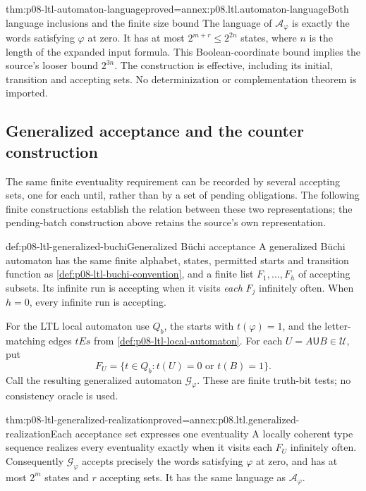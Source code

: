 \begin{hbtheorem}{thm:p08-ltl-automaton-language}{proved=annex:p08.ltl.automaton-language}{Both language inclusions and the finite size bound}
The language of \(\mathcal A_\varphi\) is exactly the words
satisfying \(\varphi\) at zero. It has at most
\(2^{m+r}\leq2^{2n}\) states, where \(n\) is the length of
the expanded input formula. This Boolean-coordinate bound implies
the source's looser bound \(2^{3n}\). The construction is
effective, including its initial, transition and accepting sets.
No determinization or complementation theorem is imported.
\end{hbtheorem}

\subsection{Generalized acceptance and the counter construction}
\label{sec:p08-ltl-generalized-acceptance}

The same finite eventuality requirement can be recorded by several
accepting sets, one for each until, rather than by a set of pending
obligations. The following finite constructions establish the
relation between these two representations; the pending-batch
construction above retains the source's own representation.

\begin{hbdefinition}{def:p08-ltl-generalized-buchi}{Generalized B\"uchi acceptance}
A generalized B\"uchi automaton has the same finite alphabet,
states, permitted starts and transition function as
\cref{def:p08-ltl-buchi-convention}, and a finite list
\(F_1,\ldots,F_h\) of accepting subsets. Its infinite run is
accepting when it visits \emph{each} \(F_j\) infinitely often.
When \(h=0\), every infinite run is accepting.

For the LTL local automaton use \(Q_b\), the starts with
\(t(\varphi)=1\), and the letter-matching edges \(tEs\)
from \cref{def:p08-ltl-local-automaton}. For each
\(U=A\mathbin{\mathsf U}B\in\mathcal U\), put
\[
 F_U=\{t\in Q_b:t(U)=0\text{ or }t(B)=1\}.
\]
Call the resulting generalized automaton \(\mathcal G_\varphi\).
These are finite truth-bit tests; no consistency oracle is used.
\end{hbdefinition}

\begin{hblemma}{thm:p08-ltl-generalized-realization}{proved=annex:p08.ltl.generalized-realization}{Each acceptance set expresses one eventuality}
A locally coherent type sequence realizes every eventuality
exactly when it visits each \(F_U\) infinitely often.
Consequently \(\mathcal G_\varphi\) accepts precisely the
words satisfying \(\varphi\) at zero, and has at most
\(2^m\) states and \(r\) accepting sets. It has the same
language as \(\mathcal A_\varphi\).
\end{hblemma}

